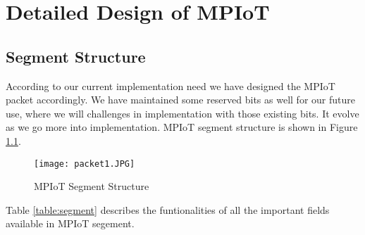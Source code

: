 
\chapter{Detailed Design of MPIoT}

\section{Segment Structure}
According to our current implementation need we have designed the MPIoT packet accordingly. We have maintained some reserved bits as well for our future use, where we will challenges in implementation with those existing bits. It evolve as we go more into implementation. MPIoT segment structure is shown in Figure \ref{fig:packet1}.

\begin{figure}[h]
  \centering
    \texttt{[image: packet1.JPG]}
  \caption{MPIoT Segment Structure}
  \label{fig:packet1}
\end{figure}

Table \ref{table:segment} describes the funtionalities of all the important fields available in MPIoT segement.

\newpage

